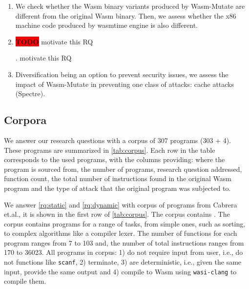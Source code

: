 \documentclass[sigplan,screen]{acmart}
\newcommand*\badge[1]{ \colorbox{red}{\color{white}#1}}
\newcommand{\tool}{{\sc Wasm-Mutate}\xspace}
\newcommand{\wasm}{Wasm\xspace}
\newcommand{\etal}{et.al.\xspace}
\newcommand{\ie}{i.e.,\xspace}
\newcommand{\todo}[1]{%
\refstepcounter{todo}
\noindent\textbf{\badge{TODO}} {\color{red}#1}
\addcontentsline{td}{todo}
{\color{red}\thesection.\thetodo\xspace #1}}
\begin{document}
\begin{enumerate}[label=RQ\arabic*:, ref=RQ\arabic*]
     \item \label{rq:static} \textbf{\rqstatic}
        We  check whether the \wasm binary variants produced by \tool are different from the original \wasm binary. Then, we assess whether the x86 machine code produced by wasmtime engine is also different.
    
    \item \label{rq:dynamic}\textbf{\rqdynamic} 
       \todo{motivate this RQ}
        
    \item \label{rq:defensive}\textbf{\rqdefensive} 
     \label{rq:performance} Diversification being an option to prevent security issues,  we assess the impact of \tool in preventing one class of attacks: cache attacks (Spectre).
        
\end{enumerate}

\subsection{Corpora}
\label{sec:corpus}



We answer our research questions with a corpus of 307 programs (303 + 4).
These programs are summarized in \autoref{tab:corpus}.
Each row in the table corresponds to the used programs, with the columns providing: where the program is sourced from, the number of programs, research question addressed, function count, the total number of instructions found in the original \wasm program and the type of attack that the original program was subjected to.

We answer \ref{rq:static} and \ref{rq:dynamic} with corpus of programs from Cabrera \etal \cite{arteaga2020crow}, it is shown in the first row of \autoref{tab:corpus}.
The corpus contains \nProgramsRosetta.
The corpus contains programs for a range of tasks, from simple ones, such as sorting, to complex algorithms like a compiler lexer. 
The number of functions for each program ranges from 7 to 103 and, the number of total instructions ranges from 170 to 36023.
All programs in corpus: 
1) do not require input from user, \ie do not  functions like \texttt{scanf}, 2) terminate, 3) are deterministic, \ie given the same input, provide the same output and 4) compile to \wasm using \texttt{wasi-clang} to compile them.
\end{document}

